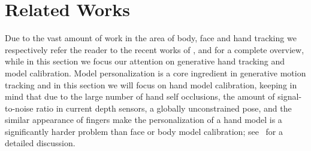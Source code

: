 \section{Related Works}
Due to the vast amount of work in the area of body, face and hand tracking we respectively refer the reader to the recent works of \cite{bogo2015detailed}, \cite{cao2016real} and \cite{taylor2016joint} for a complete overview, while in this section we focus our attention on generative hand tracking and model calibration. Model personalization is a core ingredient in generative motion tracking \cite{pons2011model} and in this section we will focus on hand model calibration, keeping in mind that due to the large number of hand self occlusions, the amount of signal-to-noise ratio in current depth sensors, a globally unconstrained pose, and the similar appearance of fingers make  the personalization of a hand model is a significantly harder problem than face or body model calibration; see~\cite{supancic2015depth} for a detailed discussion.

